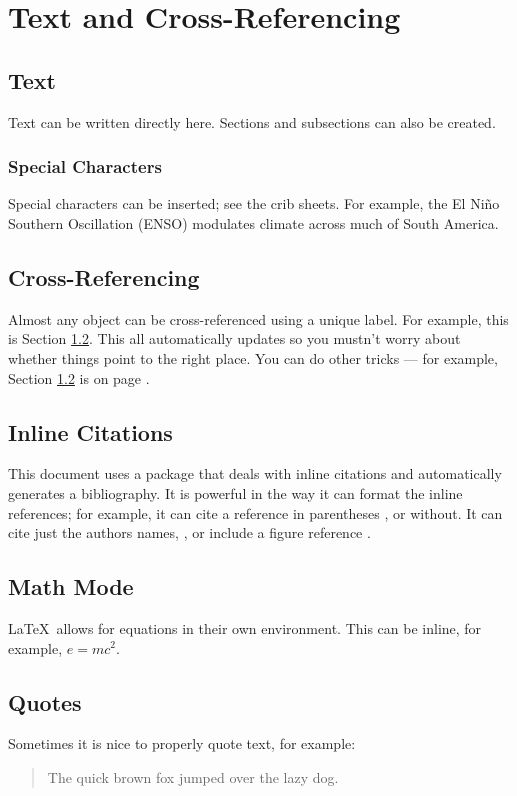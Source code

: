 \chapter{Text and Cross-Referencing}
\section{Text}
Text can be written directly here. Sections and subsections can also be created.

\subsection{Special Characters}
Special characters can be inserted; see the crib sheets. For example, the El Ni\~no Southern Oscillation (ENSO) modulates climate across much of South America. 

\section{Cross-Referencing} \label{subsectionxrefs}
Almost any object can be cross-referenced using a unique label. For example, this is Section \ref{subsectionxrefs}. This all automatically updates so you mustn't worry about whether things point to the right place. You can do other tricks --- for example, Section \ref{subsectionxrefs} is on page \pageref{subsectionxrefs}.

\section{Inline Citations}
This document uses a package that deals with inline citations and automatically generates a bibliography. It is powerful in the way it can format the inline references; for example, it can cite a reference in parentheses \Parencite[\textit{e.g.}][]{Payne2011}, or without. It can cite just the authors names, \citeauthor{Porinchu2003}, or include a figure reference \Parencite[\textit{e.g.}][Figure 1]{Payne2011}. 

\section{Math Mode}
\LaTeX \ allows for equations in their own environment. This can be inline, for example, $e=mc^{2}$.

\section{Quotes}
Sometimes it is nice to properly quote text, for example:

\begin{quote}						
The quick brown fox jumped over the lazy dog.					
\end{quote}

